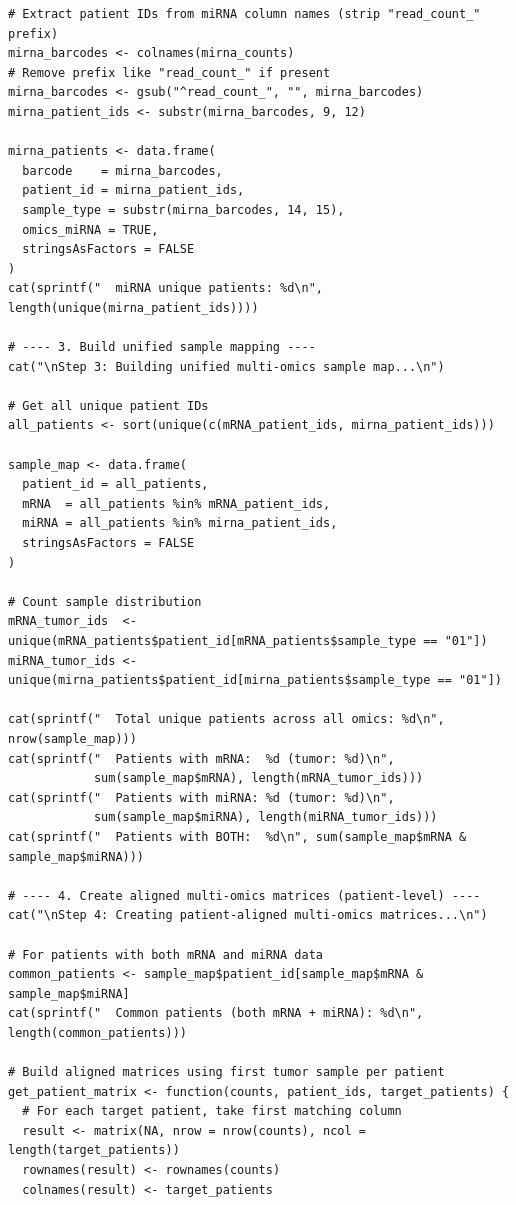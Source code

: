 \documentclass[12pt,a4paper]{ctexart}
\begin{document}
\begin{lstlisting}[caption={03_integrate_omics}, basicstyle=\ttfamily\scriptsize]
# Extract patient IDs from miRNA column names (strip "read_count_" prefix)
mirna_barcodes <- colnames(mirna_counts)
# Remove prefix like "read_count_" if present
mirna_barcodes <- gsub("^read_count_", "", mirna_barcodes)
mirna_patient_ids <- substr(mirna_barcodes, 9, 12)

mirna_patients <- data.frame(
  barcode    = mirna_barcodes,
  patient_id = mirna_patient_ids,
  sample_type = substr(mirna_barcodes, 14, 15),
  omics_miRNA = TRUE,
  stringsAsFactors = FALSE
)
cat(sprintf("  miRNA unique patients: %d\n", length(unique(mirna_patient_ids))))

# ---- 3. Build unified sample mapping ----
cat("\nStep 3: Building unified multi-omics sample map...\n")

# Get all unique patient IDs
all_patients <- sort(unique(c(mRNA_patient_ids, mirna_patient_ids)))

sample_map <- data.frame(
  patient_id = all_patients,
  mRNA  = all_patients %in% mRNA_patient_ids,
  miRNA = all_patients %in% mirna_patient_ids,
  stringsAsFactors = FALSE
)

# Count sample distribution
mRNA_tumor_ids  <- unique(mRNA_patients$patient_id[mRNA_patients$sample_type == "01"])
miRNA_tumor_ids <- unique(mirna_patients$patient_id[mirna_patients$sample_type == "01"])

cat(sprintf("  Total unique patients across all omics: %d\n", nrow(sample_map)))
cat(sprintf("  Patients with mRNA:  %d (tumor: %d)\n",
            sum(sample_map$mRNA), length(mRNA_tumor_ids)))
cat(sprintf("  Patients with miRNA: %d (tumor: %d)\n",
            sum(sample_map$miRNA), length(miRNA_tumor_ids)))
cat(sprintf("  Patients with BOTH:  %d\n", sum(sample_map$mRNA & sample_map$miRNA)))

# ---- 4. Create aligned multi-omics matrices (patient-level) ----
cat("\nStep 4: Creating patient-aligned multi-omics matrices...\n")

# For patients with both mRNA and miRNA data
common_patients <- sample_map$patient_id[sample_map$mRNA & sample_map$miRNA]
cat(sprintf("  Common patients (both mRNA + miRNA): %d\n", length(common_patients)))

# Build aligned matrices using first tumor sample per patient
get_patient_matrix <- function(counts, patient_ids, target_patients) {
  # For each target patient, take first matching column
  result <- matrix(NA, nrow = nrow(counts), ncol = length(target_patients))
  rownames(result) <- rownames(counts)
  colnames(result) <- target_patients


\end{lstlisting}
\end{document}
